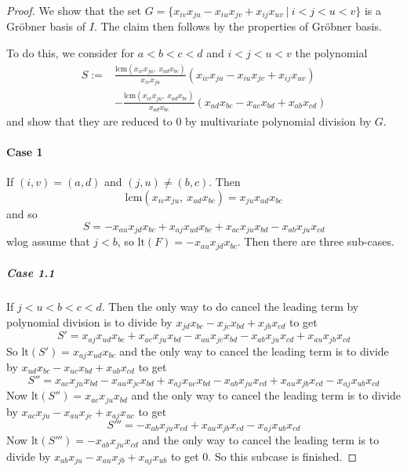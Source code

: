 \documentclass{scrartcl}
\theoremstyle{definition}
\begin{document}
\begin{proof}
    We show that the set $G = \{ x_{iv} x_{ju} - x_{iu} x_{jv} + x_{ij} x_{uv} \ | \ i < j < u < v \}$ is a Gröbner basis of $I$.
    The claim then follows by the properties of Gröbner basis.

    To do this, we consider for $a < b < c < d$ and $i < j < u < v$ the polynomial
    \begin{align*}
        S := &\frac {\mathrm{lcm}(x_{iv} x_{ju}, \ x_{ad} x_{bc})} {x_{iv} x_{ju}} (x_{iv} x_{ju} - x_{iu} x_{jv} + x_{ij} x_{uv}) \\
        &- \frac {\mathrm{lcm}(x_{iv} x_{ju}, \ x_{ad} x_{bc})} {x_{ad} x_{bc}} (x_{ad} x_{bc} - x_{ac} x_{bd} + x_{ab} x_{cd})
    \end{align*}
    and show that they are reduced to $0$ by multivariate polynomial division by $G$.

    \paragraph{Case 1} If $(i, v) = (a, d)$ and $(j, u) \neq (b, c)$. Then
    \begin{equation*}
        \mathrm{lcm}(x_{iv} x_{ju}, \ x_{ad} x_{bc}) = x_{ju} x_{ad} x_{bc}
    \end{equation*}
    and so
    \begin{equation*}
        S = -x_{au} x_{jd} x_{bc} + x_{aj} x_{ud} x_{bc} + x_{ac} x_{ju} x_{bd} - x_{ab} x_{ju} x_{cd}
    \end{equation*}
    wlog assume that $j < b$, so $\mathrm{lt}(F) = -x_{au} x_{jd} x_{bc}$.
    Then there are three sub-cases.
    \subparagraph{Case 1.1} If $j < u < b < c < d$. 
    Then the only way to do cancel the leading term by polynomial division is to divide by $x_{jd} x_{bc} - x_{jc} x_{bd} + x_{jb} x_{cd}$ to get
    \begin{equation*}
        S' = x_{aj} x_{ud} x_{bc} + x_{ac} x_{ju} x_{bd} - x_{au} x_{jc} x_{bd} - x_{ab} x_{ju} x_{cd} + x_{au} x_{jb} x_{cd}
    \end{equation*}
    So $\mathrm{lt}(S') = x_{aj} x_{ud} x_{bc}$ and the only way to cancel the leading term is to divide by $x_{ud} x_{bc} - x_{uc} x_{bd} + x_{ub} x_{cd}$ to get
    \begin{equation*}
        S'' = x_{ac} x_{ju} x_{bd} - x_{au} x_{jc} x_{bd} + x_{aj} x_{uc} x_{bd} - x_{ab} x_{ju} x_{cd} + x_{au} x_{jb} x_{cd} - x_{aj} x_{ub} x_{cd}
    \end{equation*}
    Now $\mathrm{lt}(S'') = x_{ac} x_{ju} x_{bd}$ and the only way to cancel the leading term is to divide by $x_{ac} x_{ju} - x_{au} x_{jc} + x_{aj} x_{uc}$ to get
    \begin{equation*}
        S''' = -x_{ab} x_{ju} x_{cd} + x_{au} x_{jb} x_{cd} - x_{aj} x_{ub} x_{cd}
    \end{equation*}
    Now $\mathrm{lt}(S''') = -x_{ab} x_{ju} x_{cd}$ and the only way to cancel the leading term is to divide by $x_{ab} x_{ju} - x_{au} x_{jb} + x_{aj} x_{ub}$ to get $0$.
    So this subcase is finished.


\end{proof}
\end{document}
